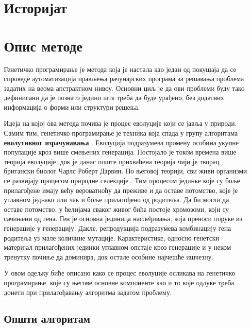 \documentclass[a4paper]{article}
\begin{document}
\section{Историјат}

\section{Опис методе}

Генетичко програмирање је метода која је настала као један од покушаја да се спроведе аутоматизација прављења рачунарских програма за решавања проблема задатих на веома апстрактном нивоу. Основни циљ је да ови проблеми буду тако дефинисани да је познато једино шта треба да буде урађено, без додатних информација о форми или структури решења.\newline

Идеја на којој ова метода почива је процес еволуције који се јавља у природи. Самим тим, генетичко програмирање је техника која спада у групу алгоритама  \textbf{еволутивног израчунавања} \cite{compIntelligence}. Еволуција подразумева промену особина укупне популације кроз више смењених генерација. Постојало је током времена више теорија еволуције, док је данас опште прихваћена теорија чији је творац британски биолог Чарлс Роберт Дарвин. По његовој теорији, сви живи организми се развијају процесом природне селекције \cite{darwin1859}. Тим процесом јединке које су боље прилагођене имају већу вероватноћу да преживе и да оставе потомство, које је углавном једнако или чак и боље прилагођено од родитеља. Да би могли да оставе потомство, у ћелијама сваког живог бића постоје хромозоми, који су сачињени од гена. Ген је основна јединица наслеђивања, која преноси поруке из генерације у генерацију. Дакле, репродукција подразумева комбинацију гена родитеља уз мале количине мутације. Карактеристике, односно генетски материјал прилагођених јединки углавном опстаје кроз генерације и у неком тренутку почиње да доминира, док остале особине најчешће ишчезну.\newline

У овом одељку биће описано како се процес еволуције осликава на генетичко програмирање, које су његове основне компоненте као и то које одлуке треба донети при прилагођавању алгоритма задатом проблему.

\subsection{Општи алгоритам}
\end{document}
